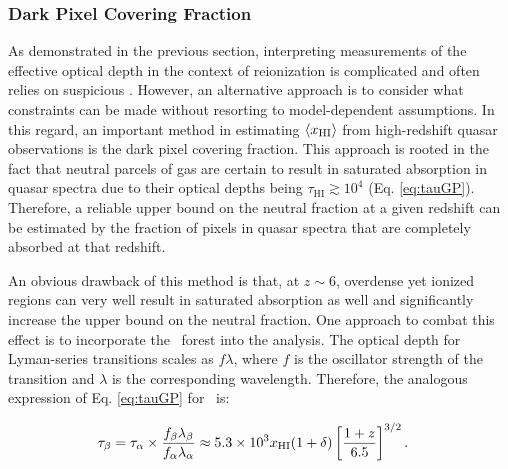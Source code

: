 %
%


\subsubsection{Dark Pixel Covering Fraction}

As demonstrated in the previous section, interpreting measurements of the effective optical depth in the context of reionization is complicated and often relies on suspicious . However, an alternative approach is to consider what constraints can be made without resorting to model-dependent assumptions. In this regard, an important method in estimating $\langle x_{\text{HI}}\rangle$ from high-redshift quasar observations is the dark pixel covering fraction. This approach is rooted in the fact that neutral parcels of gas are certain to result in saturated absorption in quasar spectra due to their optical depths being $\tau_{\text{HI}} \gtrsim 10^4$ (Eq. \ref{eq:tauGP}). Therefore, a reliable upper bound on the neutral fraction at a given redshift can be estimated by the fraction of pixels in quasar spectra that are completely absorbed at that redshift. 

An obvious drawback of this method is that, at $z \sim 6$, overdense yet ionized regions can very well result in saturated absorption as well and significantly increase the upper bound on the neutral fraction. One approach to combat this effect is to incorporate the \lyb\ forest into the analysis. The optical depth for Lyman-series transitions scales as $f\lambda$, where $f$ is the oscillator strength of the transition and $\lambda$ is the corresponding wavelength. Therefore, the analogous expression of Eq. \ref{eq:tauGP} for \lyb\ is:

\begin{align}
\tau_{\beta} &= \tau_{\alpha} \times \dfrac{f_{\beta}\lambda_{\beta}}{f_{\alpha}\lambda_{\alpha}} \approx 5.3 \times 10^{3} x_{\text{HI}} (1 + \delta) \left[\dfrac{1+z}{6.5}\right]^{3/2}. \label{eq:tauGPB}
\end{align}

